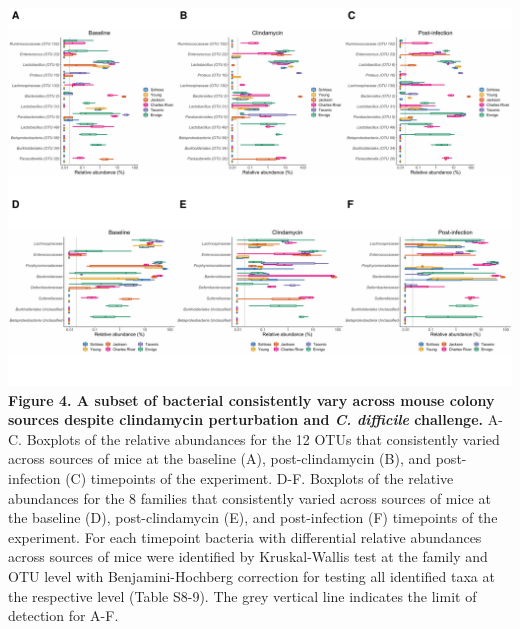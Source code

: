 \documentclass[11pt,]{article}
\begin{document}
\newpage

\includegraphics{figure_4.pdf} \textbf{Figure 4. A subset of bacterial
consistently vary across mouse colony sources despite clindamycin
perturbation and \emph{C. difficile} challenge.} A-C. Boxplots of the
relative abundances for the 12 OTUs that consistently varied across
sources of mice at the baseline (A), post-clindamycin (B), and
post-infection (C) timepoints of the experiment. D-F. Boxplots of the
relative abundances for the 8 families that consistently varied across
sources of mice at the baseline (D), post-clindamycin (E), and
post-infection (F) timepoints of the experiment. For each timepoint
bacteria with differential relative abundances across sources of mice
were identified by Kruskal-Wallis test at the family and OTU level with
Benjamini-Hochberg correction for testing all identified taxa at the
respective level (Table S8-9). The grey vertical line indicates the
limit of detection for A-F.

\newpage
\end{document}
